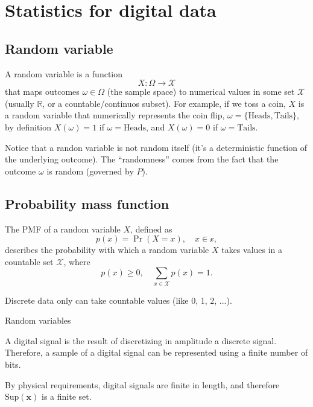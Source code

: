 \chapter{Statistics for digital data}

\section{Random variable}
A random variable is a function
\begin{equation}
  X:\Omega\rightarrow \mathcal{X}
\end{equation}
that maps outcomes $\omega\in\Omega$ (the sample space) to numerical values in some set $\mathcal{X}$ (usually $\mathbb{R}$, or a countable/continuos subset). For example, if we toss a coin, $X$ is a random variable that numerically represents the coin flip, $\omega=\{\text{Heads},\text{Tails}\}$, by definition $X(\omega)=1$ if $\omega=\text{Heads}$, and $X(\omega)=0$ if $\omega=\text{Tails}$.

Notice that a randon variable is not random itself (it's a deterministic function of the underlying outcome). The ``randomness'' comes from the fact that the outcome $\omega$ is random (governed by $P$).

\section{Probability mass function}
The \gls{PMF} of a random variable $X$, defined as
\begin{equation}
  p(x) = \Pr(X=x), \quad x\in\mathcal{x},
\end{equation}
describes the probability with which a random variable $X$ takes values in a countable set $\mathcal{X}$, where
\begin{equation*}
  p(x)\ge 0,\quad\sum_{x\in\mathcal{X}}p(x)=1.
\end{equation*}


Discrete data only can take countable values (like 0, 1, 2, ...).

Random variables

A digital signal is the result of discretizing in amplitude a discrete
signal. Therefore, a sample of a digital signal can be represented
using a finite number of bits.

By physical requirements, digital signals are finite in length, and therefore
$\text{Sup}(\mathbf{x})$ is a finite set.

